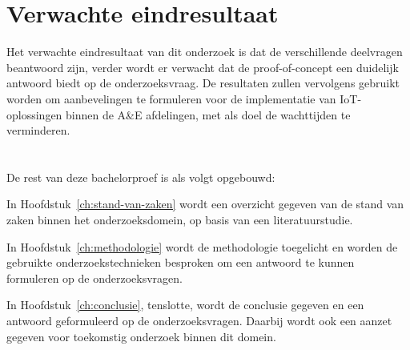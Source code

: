 \section{Verwachte eindresultaat} 
Het verwachte eindresultaat van dit onderzoek is dat de verschillende deelvragen beantwoord zijn, verder wordt er verwacht dat de proof-of-concept een duidelijk antwoord biedt op de onderzoeksvraag. De resultaten zullen vervolgens gebruikt worden om aanbevelingen te formuleren voor de implementatie van IoT-oplossingen binnen de A\&E afdelingen, met als doel de wachttijden te verminderen.


\section{}%
\label{sec:opzet-bachelorproef}


De rest van deze bachelorproef is als volgt opgebouwd:

In Hoofdstuk~\ref{ch:stand-van-zaken} wordt een overzicht gegeven van de stand van zaken binnen het onderzoeksdomein, op basis van een literatuurstudie.

In Hoofdstuk~\ref{ch:methodologie} wordt de methodologie toegelicht en worden de gebruikte onderzoekstechnieken besproken om een antwoord te kunnen formuleren op de onderzoeksvragen.


In Hoofdstuk~\ref{ch:conclusie}, tenslotte, wordt de conclusie gegeven en een antwoord geformuleerd op de onderzoeksvragen. Daarbij wordt ook een aanzet gegeven voor toekomstig onderzoek binnen dit domein.